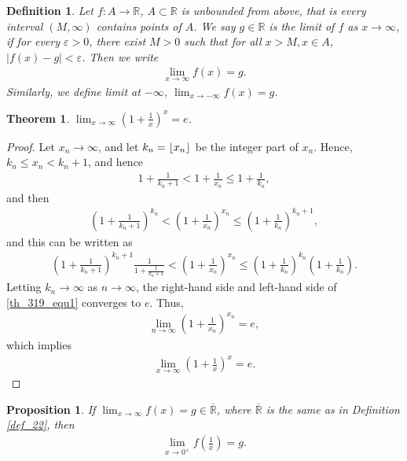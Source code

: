 \documentclass[10pt]{book}
\DeclarePairedDelimiter\floor{\lfloor}{\rfloor}
\newtheorem{definition}{Definition}[chapter]
\newtheorem{theorem}{Theorem}[chapter]
\newtheorem{proposition}{Proposition}[chapter]
\theoremstyle{definition}
\numberwithin{equation}{chapter}
\begin{document}
\medskip

\begin{definition}
Let $f: A \to \mathbb{R}$, $A \subset \mathbb{R}$ is unbounded from above, that is every interval $(M, \infty)$ contains points of $A$. We say $g \in \mathbb{R}$ is the limit of $f$ as $x \to \infty$, if for every $\varepsilon > 0$, there exist $M > 0$ such that for all $x > M, x \in A$, $\left|f(x) - g\right| < \varepsilon$. Then we write
\begin{align*}
    \lim_{x \to \infty} f(x) = g.
\end{align*}
Similarly, we define limit at $-\infty$, $\lim_{x \to -\infty} f(x) = g$. 
\end{definition}

\medskip

\begin{theorem}\label{th_319}
$\lim_{x\to\infty} \displaystyle \left(1 + \frac{1}{x}\right)^x = e$.
\end{theorem}
\begin{proof}
Let $x_n \to \infty$, and let $k_n = \floor*{x_n}$ be the integer part of $x_n$. Hence, $k_n \leq x_n < k_n + 1$, and hence
\begin{align*}
    1 + \frac{1}{k_n + 1} < 1 + \frac{1}{x_n} \leq 1 + \frac{1}{k_n},
\end{align*}
and then 
\begin{align*}
    \left(1 + \frac{1}{k_n + 1}\right)^{k_n} < \left(1 + \frac{1}{x_n}\right)^{x_n} \leq \left(1 + \frac{1}{k_n}\right)^{k_n+1},
\end{align*}
and this can be written as
\begin{align}\label{th_319_equ1}
    \left(1 + \frac{1}{k_n + 1}\right)^{k_n+1} \frac{1}{1 + \frac{1}{k_n + 1}} < \left(1 + \frac{1}{x_n}\right)^{x_n} \leq \left(1 + \frac{1}{k_n}\right)^{k_n} \left(1 + \frac{1}{k_n}\right).
\end{align}
Letting $k_n \to \infty$ as $n \to \infty$, the right-hand side and left-hand side of \eqref{th_319_equ1} converges to $e$. Thus,
\begin{align*}
    \lim_{n\to\infty} \left(1 + \frac{1}{x_n}\right)^{x_n} = e,
\end{align*}
which implies
\begin{align*}
    \lim_{x\to\infty} \left(1 + \frac{1}{x}\right)^{x} = e.
\end{align*}
\end{proof}

\medskip

\begin{proposition}\label{prop_31}
If $\lim_{x\to\infty} f(x) = g \in \overline{\mathbb{R}}$, where $\overline{\mathbb{R}}$ is the same as in Definition \ref{def_22}, then
\begin{align*}
    \lim_{x \to 0^+} f\left(\frac{1}{x}\right) = g.
\end{align*}
\end{proposition}
\end{document}
